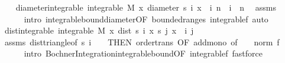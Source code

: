 \begin{isabellebody}
\ \ \isamarkupfalse%
\ diameter{\isacharunderscore}{\kern0pt}integrable{\isacharcolon}{\kern0pt}\ {\isachardoublequoteopen}integrable\ M\ {\isacharparenleft}{\kern0pt}{\isasymlambda}x{\isachardot}{\kern0pt}\ diameter\ {\isacharbraceleft}{\kern0pt}s\ i\ x\ {\isacharbar}{\kern0pt}\ i{\isachardot}{\kern0pt}\ n\ {\isasymle}\ i{\isacharbraceright}{\kern0pt}{\isacharparenright}{\kern0pt}{\isachardoublequoteclose}\ \ n\ \isamarkupfalse%
\ assms{\isacharparenleft}{\kern0pt}{}{\isacharcomma}{\kern0pt}{}{\isacharparenright}{\kern0pt}\ \isanewline
\ \ \ \ \isamarkupfalse%
\ {\isacharparenleft}{\kern0pt}intro\ integrable{\isacharunderscore}{\kern0pt}bound{\isacharunderscore}{\kern0pt}diameter{\isacharbrackleft}{\kern0pt}OF\ bounded{\isacharunderscore}{\kern0pt}range{\isacharunderscore}{\kern0pt}s\ integrable{\isacharunderscore}{\kern0pt}{}f{\isacharbrackright}{\kern0pt}{\isacharcomma}{\kern0pt}\ auto{\isacharparenright}{\kern0pt}\isanewline
\isanewline
\ \ \isamarkupfalse%
\ dist{\isacharunderscore}{\kern0pt}integrable{\isacharcolon}{\kern0pt}\ {\isachardoublequoteopen}integrable\ M\ {\isacharparenleft}{\kern0pt}{\isasymlambda}x{\isachardot}{\kern0pt}\ dist\ {\isacharparenleft}{\kern0pt}s\ i\ x{\isacharparenright}{\kern0pt}\ {\isacharparenleft}{\kern0pt}s\ j\ x{\isacharparenright}{\kern0pt}{\isacharparenright}{\kern0pt}{\isachardoublequoteclose}\ \ i\ j\ \ \isamarkupfalse%
\ assms{\isacharparenleft}{\kern0pt}{}{\isacharparenright}{\kern0pt}\ dist{\isacharunderscore}{\kern0pt}triangle{}{\isacharbrackleft}{\kern0pt}of\ {\isachardoublequoteopen}s\ i\ {\isacharunderscore}{\kern0pt}{\isachardoublequoteclose}\ {\isacharunderscore}{\kern0pt}\ {}{\isacharcomma}{\kern0pt}\ THEN\ order{\isacharunderscore}{\kern0pt}trans{\isacharcomma}{\kern0pt}\ OF\ add{\isacharunderscore}{\kern0pt}mono{\isacharcomma}{\kern0pt}\ of\ {\isacharunderscore}{\kern0pt}\ {\isachardoublequoteopen}{}\ {\isacharasterisk}{\kern0pt}\ norm\ {\isacharparenleft}{\kern0pt}f\ {\isacharunderscore}{\kern0pt}{\isacharparenright}{\kern0pt}{\isachardoublequoteclose}{\isacharbrackright}{\kern0pt}\isanewline
\ \ \ \ \isamarkupfalse%
\ {\isacharparenleft}{\kern0pt}intro\ Bochner{\isacharunderscore}{\kern0pt}Integration{\isachardot}{\kern0pt}integrable{\isacharunderscore}{\kern0pt}bound{\isacharbrackleft}{\kern0pt}OF\ integrable{\isacharunderscore}{\kern0pt}{}f{\isacharbrackright}{\kern0pt}{\isacharparenright}{\kern0pt}\ fastforce{\isacharplus}{\kern0pt}%

\end{isabellebody}
